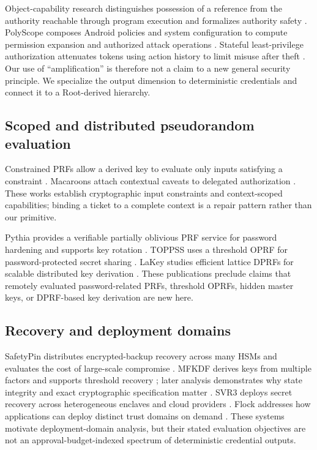 \documentclass[preprint,12pt]{elsarticle}
\begin{document}
Object-capability research distinguishes possession of a reference from the
authority reachable through program execution and formalizes authority safety
\cite{maffeis2010capabilities}.  PolyScope composes Android policies and system
configuration to compute permission expansion and authorized attack operations
\cite{lee2021polyscope}.  Stateful least-privilege authorization attenuates
tokens using action history to limit misuse after theft
\cite{cao2024leastprivilege}.  Our use of ``amplification'' is therefore not a
claim to a new general security principle.  We specialize the output dimension
to deterministic credentials and connect it to a Root-derived hierarchy.

\subsection{Scoped and distributed pseudorandom evaluation}

Constrained PRFs allow a derived key to evaluate only inputs satisfying a
constraint \cite{boneh2013constrained}.  Macaroons attach contextual caveats to
delegated authorization \cite{birgisson2014macaroons}.  These works establish
cryptographic input constraints and context-scoped capabilities; binding a
ticket to a complete context is a repair pattern rather than our primitive.

Pythia provides a verifiable partially oblivious PRF service for password
hardening and supports key rotation \cite{everspaugh2015pythia}.  TOPPSS uses a
threshold OPRF for password-protected secret sharing
\cite{jarecki2017toppss}.  LaKey studies efficient lattice DPRFs for scalable
distributed key derivation \cite{geihs2024lakey}.  These publications preclude
claims that remotely evaluated password-related PRFs, threshold OPRFs, hidden
master keys, or DPRF-based key derivation are new here.

\subsection{Recovery and deployment domains}

SafetyPin distributes encrypted-backup recovery across many HSMs and evaluates
the cost of large-scale compromise \cite{dauterman2020safetypin}.  MFKDF derives
keys from multiple factors and supports threshold recovery
\cite{nair2023mfkdf}; later analysis demonstrates why state integrity and exact
cryptographic specification matter \cite{scarlata2024mfkdf}.  SVR3 deploys
secret recovery across heterogeneous enclaves and cloud providers
\cite{connell2024svr3}.  Flock addresses how applications can deploy distinct
trust domains on demand \cite{kaviani2024flock}.  These systems motivate
deployment-domain analysis, but their stated evaluation objectives are not an
approval-budget-indexed spectrum of deterministic credential outputs.
\end{document}
